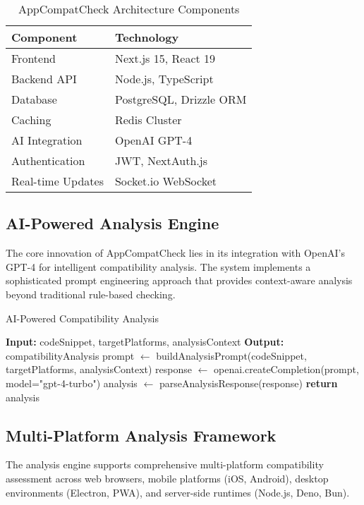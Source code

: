 \documentclass[conference]{IEEEtran}
\begin{document}
\begin{table}[htbp]
\caption{AppCompatCheck Architecture Components}
\begin{center}
\begin{tabular}{|l|l|}
\hline
\textbf{Component} & \textbf{Technology} \\
\hline
Frontend & Next.js 15, React 19 \\
Backend API & Node.js, TypeScript \\
Database & PostgreSQL, Drizzle ORM \\
Caching & Redis Cluster \\
AI Integration & OpenAI GPT-4 \\
Authentication & JWT, NextAuth.js \\
Real-time Updates & Socket.io WebSocket \\
\hline
\end{tabular}
\label{tab:architecture}
\end{center}
\end{table}

\subsection{AI-Powered Analysis Engine}
The core innovation of AppCompatCheck lies in its integration with OpenAI's GPT-4 for intelligent compatibility analysis. The system implements a sophisticated prompt engineering approach that provides context-aware analysis beyond traditional rule-based checking.

\begin{algorithm}
\caption{AI-Powered Compatibility Analysis}
\begin{algorithmic}[1]
\STATE \textbf{Input:} codeSnippet, targetPlatforms, analysisContext
\STATE \textbf{Output:} compatibilityAnalysis
\STATE prompt $\leftarrow$ buildAnalysisPrompt(codeSnippet, targetPlatforms, analysisContext)
\STATE response $\leftarrow$ openai.createCompletion(prompt, model="gpt-4-turbo")
\STATE analysis $\leftarrow$ parseAnalysisResponse(response)
\STATE \textbf{return} analysis
\end{algorithmic}
\end{algorithm}

\subsection{Multi-Platform Analysis Framework}
The analysis engine supports comprehensive multi-platform compatibility assessment across web browsers, mobile platforms (iOS, Android), desktop environments (Electron, PWA), and server-side runtimes (Node.js, Deno, Bun).
\end{document}
